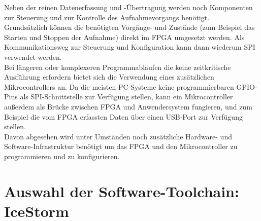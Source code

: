 Neben der reinen Datenerfassung und -Übertragung werden noch Komponenten zur Steuerung und zur Kontrolle des Aufnahmevorgangs benötigt.\\
Grundsätzlich können die benötigten Vorgänge- und Zustände (zum Beispiel das Starten und Stoppen der Aufnahme) direkt im FPGA umgesetzt werden. Als Kommunikationsweg zur Steuerung und Konfiguration kann dann wiederum SPI verwendet werden.\\
Bei längeren oder komplexeren Programmabläufen die keine zeitkritische Ausführung erfordern bietet sich die Verwendung eines zusätzlichen Mikrocontrollers an. Da die meisten PC-Systeme keine programmierbaren \acrshort{GPIO}-Pins als SPI-Schnittstelle zur Verfügung stellen, kann ein Mikrocontroller außerdem als Brücke zwischen FPGA und Anwendersystem fungieren, und zum Beispiel die vom FPGA erfassten Daten über einen USB-Port zur Verfügung stellen.\\
Davon abgesehen wird unter Umständen noch zusätzliche Hardware- und Software-Infrastruktur benötigt um das FPGA und den Mikrocontroller zu programmieren und zu konfigurieren.
\clearpage

\section{Auswahl der Software-Toolchain: IceStorm}

